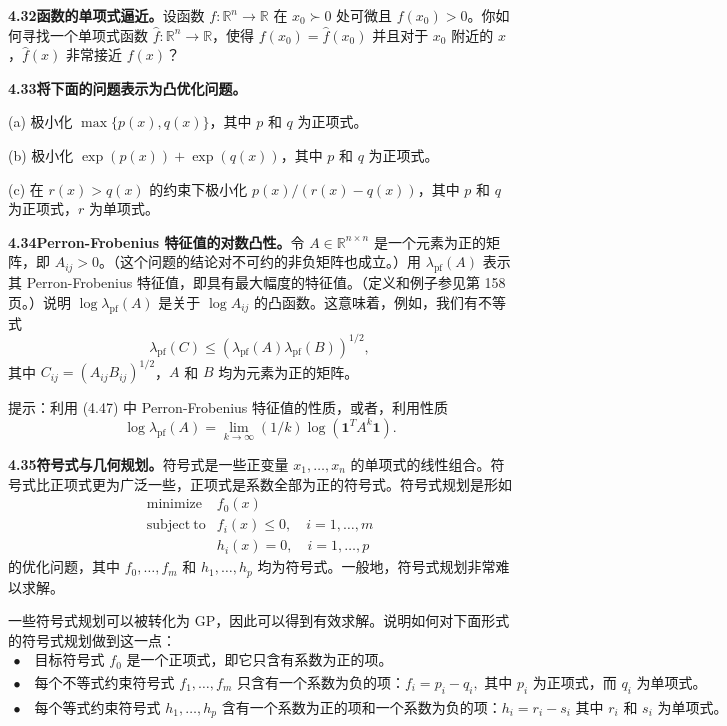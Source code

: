 \documentclass[UTF8,12pt,a4paper,fontset=fandol]{ctexart}
\begin{document}
\noindent\textbf{4.32\quad 函数的单项式逼近。}\quad 设函数 $f:\mathbb{R}^n\to\mathbb{R}$ 在 $x_0\succ0$ 处可微且 $f(x_0)>0$。你如何寻找一个单项式函数 $\hat f:\mathbb{R}^n\to\mathbb{R}$，使得 $f(x_0)=\hat f(x_0)$ 并且对于 $x_0$ 附近的 $x$，$\hat f(x)$ 非常接近 $f(x)$？

\noindent\textbf{4.33\quad 将下面的问题表示为凸优化问题。}

(a) 极小化 $\max\{p(x),q(x)\}$，其中 $p$ 和 $q$ 为正项式。

(b) 极小化 $\exp(p(x))+\exp(q(x))$，其中 $p$ 和 $q$ 为正项式。

(c) 在 $r(x)>q(x)$ 的约束下极小化 $p(x)/(r(x)-q(x))$，其中 $p$ 和 $q$ 为正项式，$r$ 为单项式。

\noindent\textbf{4.34\quad Perron-Frobenius 特征值的对数凸性。}\quad 令 $A\in\mathbb{R}^{n\times n}$ 是一个元素为正的矩阵，即 $A_{ij}>0$。（这个问题的结论对不可约的非负矩阵也成立。）用 $\lambda_{\mathrm{pf}}(A)$ 表示其 Perron-Frobenius 特征值，即具有最大幅度的特征值。（定义和例子参见第 158 页。）说明 $\log\lambda_{\mathrm{pf}}(A)$ 是关于 $\log A_{ij}$ 的凸函数。这意味着，例如，我们有不等式
\[
\lambda_{\mathrm{pf}}(C)\leq(\lambda_{\mathrm{pf}}(A)\lambda_{\mathrm{pf}}(B))^{1/2},
\]
其中 $C_{ij}=(A_{ij}B_{ij})^{1/2}$，$A$ 和 $B$ 均为元素为正的矩阵。

提示：利用 (4.47) 中 Perron-Frobenius 特征值的性质，或者，利用性质
\[
\log\lambda_{\mathrm{pf}}(A)=\lim_{k\to\infty}(1/k)\log(\mathbf{1}^TA^k\mathbf{1}).
\]

\noindent\textbf{4.35\quad 符号式与几何规划。}\quad 符号式是一些正变量 $x_1,\ldots,x_n$ 的单项式的线性组合。符号式比正项式更为广泛一些，正项式是系数全部为正的符号式。符号式规划是形如
\[
\begin{array}{ll}
\mathop{\mathrm{minimize}} & f_0(x)\\
\mathrm{subject\ to} & f_i(x)\leq0,\quad i=1,\ldots,m\\
& h_i(x)=0,\quad i=1,\ldots,p
\end{array}
\]
的优化问题，其中 $f_0,\ldots,f_m$ 和 $h_1,\ldots,h_p$ 均为符号式。一般地，符号式规划非常难以求解。

一些符号式规划可以被转化为 GP，因此可以得到有效求解。说明如何对下面形式的符号式规划做到这一点：
\[
\begin{array}{l}
\bullet\quad \text{目标符号式 }f_0\text{ 是一个正项式，即它只含有系数为正的项。}\\
\bullet\quad \text{每个不等式约束符号式 }f_1,\ldots,f_m\text{ 只含有一个系数为负的项：}f_i=p_i-q_i,\text{ 其中 }p_i\text{ 为正项式，而 }q_i\text{ 为单项式。}\\
\bullet\quad \text{每个等式约束符号式 }h_1,\ldots,h_p\text{ 含有一个系数为正的项和一个系数为负的项：}h_i=r_i-s_i\text{ 其中 }r_i\text{ 和 }s_i\text{ 为单项式。}
\end{array}
\]
\end{document}
